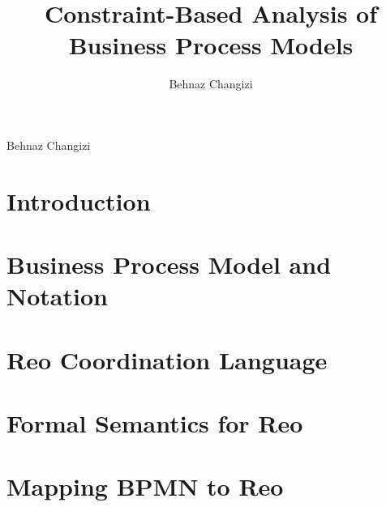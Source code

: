 \documentclass[runnngheads]{book}
\author{Behnaz Changizi}
\renewcommand{\maketitle}
{
	\singlespacing
	\thispagestyle{empty}
	\vspace*{\fill} \vspace{150pt} \begin{center}
		\Huge \textcolor{black} \thetitle \normalsize 
	
	\sc \vspace{100pt}
	Behnaz Changizi %
%	
%	
%	
%	
	\end{center}
	\vspace*{\fill}
}
\begin{document}

\pagestyle{empty}
\afterpage{\null\newpage}
\newpage
\title{Constraint-Based Analysis of Business Process Models}
\pagestyle{empty}
\maketitle
\newpage
\newpage
\vspace*{20cm}


\thispagestyle{empty}
\frontmatter
\tableofcontents



\newsavebox\behbox
\begin{lrbox}{\behbox}
\end{lrbox}

\pagestyle{empty}

\thispagestyle{empty}
\lstlistoflistings
\clearpage

\thispagestyle{empty}
\pagestyle{empty}
\listoffigures 
\clearpage


\listoftables

\onehalfspacing

\pagestyle{plain}
\clearpage

\mainmatter
\chapter{Introduction}

\chapter{Business Process Model and Notation}
\label{ch:bpmn}

\chapter{Reo Coordination Language}
\label{ch:reo}

\chapter{Formal Semantics for Reo}
\label{ch:formsem}


\chapter{Mapping BPMN to Reo}
\label{ch:mapping}

\end{document}
